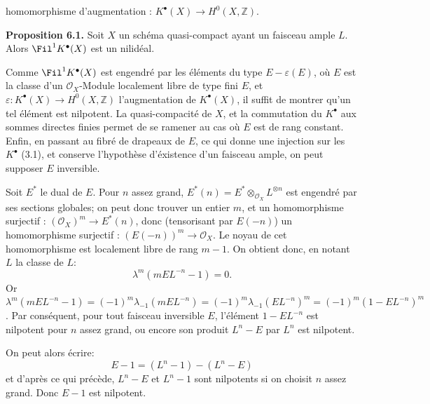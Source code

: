 homomorphisme d'augmentation : $K^{\bullet}(X)\longrightarrow H^0(X,\mathbb Z)$.

\textbf{Proposition 6.1.} Soit $X$ un schéma quasi-compact ayant un faisceau ample $L$. Alors $\Fil^1K^{\bullet}(X)$ est un nilidéal.

Comme $\Fil^1K^{\bullet}(X)$ est engendré par les éléments du type $E-\varepsilon(E)$, où $E$ est la classe d'un $\mathcal O_X$-Module localement libre de type fini $E$, et $\varepsilon:K^{\bullet}(X)\to H^0(X,\mathbb Z)$ l'augmentation de $K^{\bullet}(X)$, il suffit de montrer qu'un tel élément est nilpotent. La quasi-compacité de $X$, et la commutation du $K^{\bullet}$ aux sommes directes finies permet de se ramener au cas où $E$ est de rang constant. Enfin, en passant au fibré de drapeaux de $E$, ce qui donne une injection sur les $K^{\bullet}$ (3.1), et conserve l'hypothèse d'éxistence d'un faisceau ample, on peut supposer $E$ inversible.

Soit $E^*$ le dual de $E$. Pour $n$ assez grand, $E^*(n)=E^*\otimes_{\mathcal O_X}L^{\otimes n}$ est engendré par ses sections globales; on peut donc trouver un entier $m$, et un homomorphisme surjectif : $(\mathcal O_X)^m\longrightarrow E^*(n)$, donc (tensorisant par $E(-n)$) un homomorphisme surjectif : $(E(-n))^m\longrightarrow\mathcal O_X$. Le noyau de cet homomorphisme est localement libre de rang $m-1$. On obtient donc, en notant $L$ la classe de $L$:
\[
  \lambda^m(mEL^{-n}-1)=0 .
\]
Or $\lambda^m(mEL^{-n}-1)=(-1)^m\lambda_{-1}(mEL^{-n})=(-1)^m\lambda_{-1}(EL^{-n})^m=(-1)^m(1-EL^{-n})^m$. Par conséquent, pour tout faisceau inversible $E$, l'élément $1-EL^{-n}$ est nilpotent pour $n$ assez grand, ou encore son produit $L^n-E$ par $L^n$ est nilpotent.

On peut alors écrire:
\[
  E-1=(L^n-1)-(L^n-E)
\]
et d'après ce qui précède, $L^n-E$ et $L^n-1$ sont nilpotents si on choisit $n$ assez grand. Donc $E-1$ est nilpotent.


